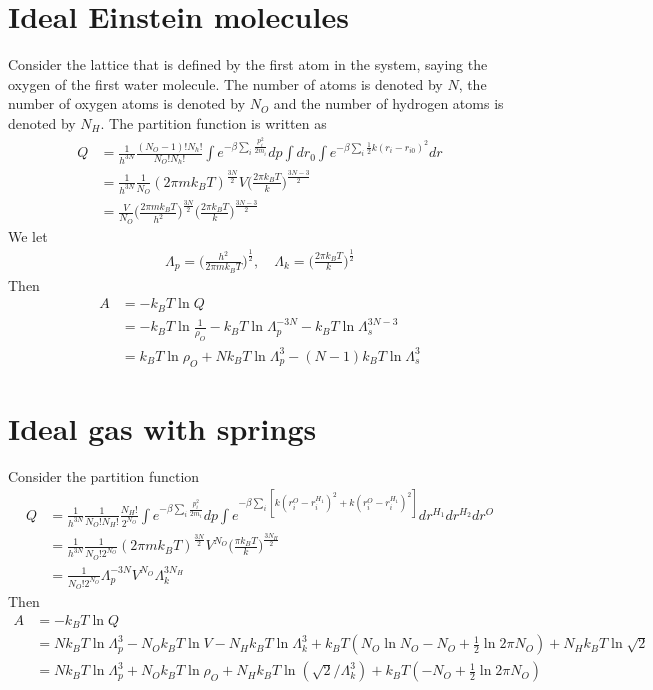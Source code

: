 \documentclass[aps,pre,a4paper,showkeys,fleqn]{revtex4}
\begin{document}
\section{Ideal Einstein molecules}
Consider the lattice that is defined by the first atom in the system, saying the oxygen of the first water molecule.
The number of atoms is denoted by $N$, the number of oxygen atoms is denoted by $N_O$ and the number of hydrogen atoms is denoted by $N_H$.
The partition function is written as
\begin{align*}
  Q & = \frac{1}{h^{3N}}
      \frac{(N_O-1)!N_h!}{N_O!N_h!}
      \int e^{-\beta\sum_i\frac{p_i^2}{2m_i}} dp
      \int dr_0\int e^{-\beta\sum_i \frac 12k(r_i - r_{i0})^2} dr \\
    &=
      \frac{1}{h^{3N}}\frac{1}{N_O}
      (2\pi m k_BT)^{\frac{3N}{2}}
      {V}
      \Big(\frac{2\pi k_BT}{k}\Big)^{\frac{3N-3}2} \\
    &=
      \frac{V}{N_O}
      \Big( \frac{2\pi m k_BT}{h^2} \Big)^{\frac{3N}{2}}
      \Big( \frac{2\pi k_BT}{k} \Big)^{\frac{3N-3}{2}}
\end{align*}
We let
\begin{align*}
  \Lambda_p = \Big(\frac{h^2}{2\pi m k_BT}\Big)^{\frac12}, \quad \Lambda_k = \Big(\frac{2\pi k_BT}{k}\Big)^{\frac12}
\end{align*}
Then
\begin{align*}
  A
  &=
    -k_BT \ln Q \\
  &=
    -k_BT \ln \frac1{\rho_O} - k_BT \ln \Lambda_p^{-3N} - k_BT \ln \Lambda_s^{3N-3} \\
  &=
    k_BT \ln {\rho_O} + Nk_BT \ln \Lambda_p^3 - (N-1) k_BT \ln \Lambda_s^3
\end{align*}


\section{Ideal gas with springs}
Consider the partition function
\begin{align*}
  Q
  &=
    \frac{1}{h^{3N}}\frac{1}{N_O! N_H!}
    \frac{N_H!}{2^{N_O}}
    \int e^{-\beta\sum_i\frac{p_i^2}{2m_i}} dp
    \int e^{-\beta \sum_i [k(r^O_i-r^{H_1}_i)^2 + k(r^O_i-r^{H_1}_i)^2]} dr^{H_1}dr^{H_2} dr^O\\
  &=
    \frac{1}{h^{3N}}\frac{1}{N_O! 2^{N_O}}
    (2\pi m k_BT)^{\frac{3N}{2}}
    V^{N_O}
    \Big(\frac{\pi k_BT}{k}\Big)^{\frac{3N_H}2} \\
  &=
    \frac{1}{N_O! 2^{N_O}}
    \Lambda_p^{-3N}
    V^{N_O}
    \Lambda_k^{3N_H}
\end{align*}
Then
\begin{align*}
  A
  &=
    -k_BT\ln Q\\
  &=
    Nk_BT\ln \Lambda_p^3
    -N_Ok_BT\ln V
    -N_Hk_BT\ln\Lambda_k^3 
    + k_BT(N_O\ln N_O - N_O + \frac12\ln 2\pi N_O)
    + N_H k_BT\ln \sqrt2 \\
  &=
    Nk_BT\ln \Lambda_p^3
    + N_Ok_BT\ln\rho_O
    + N_Hk_BT\ln(\sqrt2/\Lambda_k^3)
    + k_BT( - N_O + \frac12\ln 2\pi N_O)
\end{align*}


{}

\end{document}
